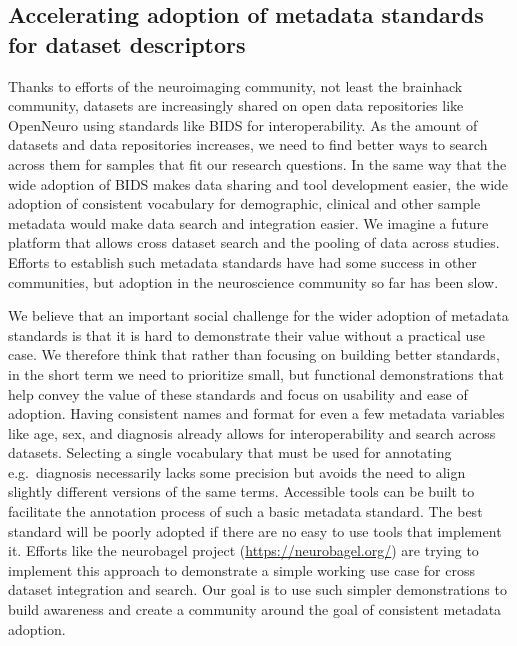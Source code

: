 \documentclass[../main.tex]{subfiles}
\begin{document}
\subsection{Accelerating adoption of metadata standards for dataset descriptors}



Thanks to efforts of the neuroimaging community, not least the brainhack community\supercite{Gau2021}, datasets are increasingly shared on open data repositories like OpenNeuro\supercite{Markiewicz2021-bf} using standards like BIDS\supercite{Gorgolewski2016} for interoperability. As the amount of datasets and data repositories increases, we need to find better ways to search across them for samples that fit our research questions. In the same way that the wide adoption of BIDS makes data sharing and tool development easier, the wide adoption of consistent vocabulary for demographic, clinical and other sample metadata would make data search and integration easier. We imagine a future platform that allows cross dataset search and the pooling of data across studies. Efforts to establish such metadata standards have had some success in other communities\supercite{Field2008-kw, Stang2010-nl}, but adoption in the neuroscience community so far has been slow. 

We believe that an important social challenge for the wider adoption of metadata standards is that it is hard to demonstrate their value without a practical use case. We therefore think that rather than focusing on building better standards, in the short term we need to prioritize small, but functional demonstrations that help convey the value of these standards and focus on usability and ease of adoption. Having consistent names and format for even a few metadata variables like age, sex, and diagnosis already allows for interoperability and search across datasets. Selecting a single vocabulary that must be used for annotating e.g.\ diagnosis necessarily lacks some precision but avoids the need to align slightly different versions of the same terms. Accessible tools can be built to facilitate the annotation process of such a basic metadata standard. The best standard will be poorly adopted if there are no easy to use tools that implement it. Efforts like the neurobagel project (\url{https://neurobagel.org/}) are trying to implement this approach to demonstrate a simple working use case for cross dataset integration and search. Our goal is to use such simpler demonstrations to build awareness and create a community around the goal of consistent metadata adoption.
\end{document}
